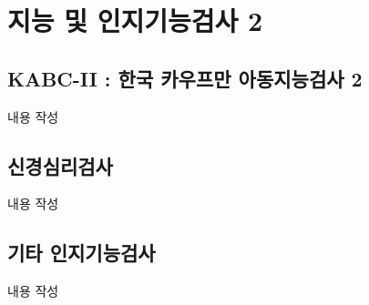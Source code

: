\section{지능 및 인지기능검사 2}

\subsection{KABC-II : 한국 카우프만 아동지능검사 2}
내용 작성

\subsection{신경심리검사}
내용 작성

\subsection{기타 인지기능검사}
내용 작성
